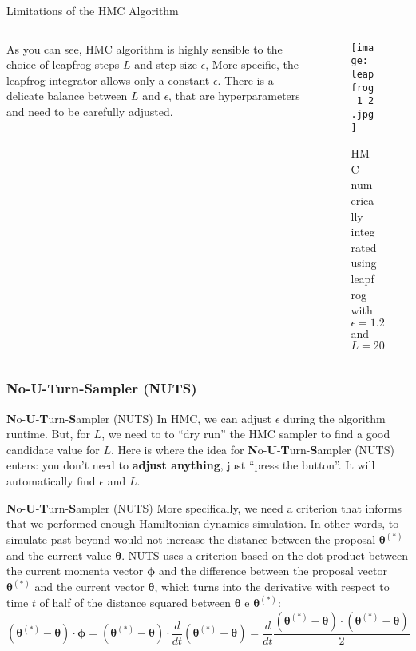 \begin{frame}{Limitations of the HMC Algorithm}
	\begin{columns}
		\begin{column}{0.6\textwidth}
			As you can see, HMC algorithm is highly sensible to the choice of
			leapfrog steps $L$ and step-size $\epsilon$,
			More specific, the leapfrog integrator allows only a constant $\epsilon$.
			There is a delicate balance between $L$ and $\epsilon$,
			that are hyperparameters and need to be carefully adjusted.
		\end{column}
		\begin{column}{0.4\textwidth}
			\begin{figure}
				\texttt{[image: leapfrog\_1\_2.jpg]}
				\caption{HMC numerically integrated using leapfrog with $\epsilon = 1.2$ and $L = 20$}
			\end{figure}
		\end{column}
	\end{columns}
\end{frame}

\subsubsection{No-U-Turn-Sampler (NUTS)}
\begin{frame}{\textbf{N}o-\textbf{U}-\textbf{T}urn-\textbf{S}ampler (NUTS)}
	In HMC, we can adjust $\epsilon$ during the algorithm runtime.
	But, for $L$, we need to to ``dry run'' the HMC sampler to find a good candidate value for $L$.
	\vfill
	Here is where the idea for \textbf{N}o-\textbf{U}-\textbf{T}urn-\textbf{S}ampler (NUTS)
	\parencite{hoffman2014no} enters:
	you don't need to \textbf{adjust anything},
	just ``press the button''.
	It will automatically find $\epsilon$ and $L$.
\end{frame}

\begin{frame}{\textbf{N}o-\textbf{U}-\textbf{T}urn-\textbf{S}ampler (NUTS)}
	More specifically, we need a criterion that informs that we performed
	enough Hamiltonian dynamics simulation.
	In other words, to simulate past beyond would not increase the distance
	between the proposal $\boldsymbol{\theta}^{(*)}$ and the current value $\boldsymbol{\theta}$.
	\vfill
	NUTS uses a criterion based on the dot product between the current momenta vector
	$\boldsymbol{\phi}$ and the difference between the proposal vector $\boldsymbol{\theta}^{(*)}$
	and the current vector $\boldsymbol{\theta}$,
	which turns into the derivative with respect to time $t$ of half of the distance squared between
	$\boldsymbol{\theta}$ e $\boldsymbol{\theta}^{(*)}$:
	$$
		(\boldsymbol{\theta}^{(*)} - \boldsymbol{\theta}) \cdot \boldsymbol{\phi}
		= (\boldsymbol{\theta}^{(*)} - \boldsymbol{\theta}) \cdot \frac{d}{dt} (\boldsymbol{\theta}^{(*)} - \boldsymbol{\theta})
		= \frac{d}{dt} \frac{(\boldsymbol{\theta}^{(*)} - \boldsymbol{\theta}) \cdot (\boldsymbol{\theta}^{(*)} - \boldsymbol{\theta})}{2}
	$$
\end{frame}

